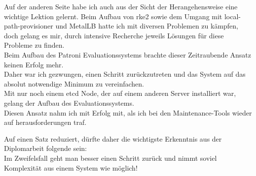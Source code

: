 \begin{flushleft}
    Auf der anderen Seite habe ich auch aus der Sicht der Herangehensweise eine wichtige Lektion gelernt.
    Beim Aufbau von \gls{rke2} sowie dem Umgang mit \gls{local-path-provisioner} und \Gls{MetalLB} hatte ich mit diversen Problemen zu kämpfen,\\
    doch gelang es mir, durch intensive Recherche jeweils Lösungen für diese Probleme zu finden.\\
    Beim Aufbau des Patroni Evaluationssystems brachte dieser Zeitraubende Ansatz keinen Erfolg mehr.\\
    Daher war ich gezwungen, einen Schritt zurückzutreten und das System auf das absolut notwendige Minimum zu vereinfachen.\\
    Mit nur noch einem \gls{etcd} Node, der auf einem anderen Server installiert war, gelang der Aufbau des Evaluationssystems.\\
    Diesen Ansatz nahm ich mit Erfolg mit, als ich bei den Maintenance-Tools wieder auf herausforderungen traf.
\end{flushleft}
\begin{flushleft}
    Auf einen Satz reduziert, dürfte daher die wichtigste Erkenntnis aus der Diplomarbeit folgende sein:\\
    \guillemotleft Im Zweifelsfall geht man besser einen Schritt zurück und nimmt soviel Komplexität aus einem System wie möglich!\guillemotright
\end{flushleft}